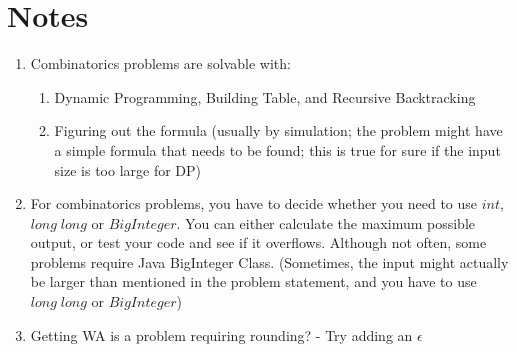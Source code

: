 \documentclass[12pt]{book}
\begin{document}
\section{Notes}
\begin{enumerate}[label = \roman*.]
\item Combinatorics problems are solvable with:
\begin{enumerate}
\item Dynamic Programming, Building Table, and Recursive Backtracking
\item Figuring out the formula (usually by simulation; the problem might have a simple formula that needs to be found; this is true for sure if the input size is too large for DP)
\end{enumerate}
\item For combinatorics problems, you have to decide whether you need to use $int$, $long\;long$ or $BigInteger$. You can either calculate the maximum possible output, or test your code and see if it overflows. Although not often, some problems require Java BigInteger Class. (Sometimes, the input might actually be larger than mentioned in the problem statement, and you have to use $long\;long$ or $BigInteger$)
\item Getting WA is a problem requiring rounding? - Try adding an $\epsilon$
\end{enumerate}
\end{document}
